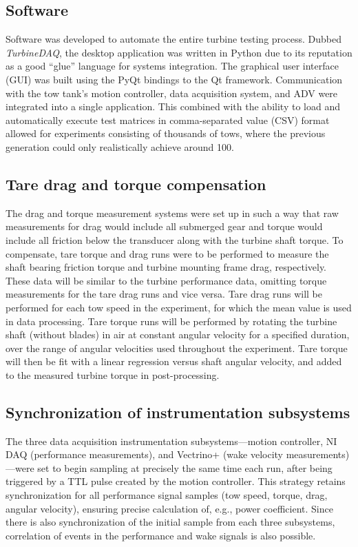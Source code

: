\subsection{Software}

Software was developed to automate the entire turbine testing process. Dubbed
\textit{TurbineDAQ}, the desktop application was written in Python due to its
reputation as a good ``glue'' language for systems integration. The graphical
user interface (GUI) was built using the PyQt bindings to the Qt framework.
Communication with the tow tank's motion controller, data acquisition system,
and ADV were integrated into a single application. This combined with the
ability to load and automatically execute test matrices in comma-separated value
(CSV) format allowed for experiments consisting of thousands of tows, where the
previous generation could only realistically achieve around 100.


\subsection{Tare drag and torque compensation} 

The drag and torque measurement systems were set up in such a way that raw
measurements for drag would include all submerged gear and torque would include
all friction below the transducer along with the turbine shaft torque. To
compensate, tare torque and drag runs were to be performed to measure the shaft
bearing friction torque and turbine mounting frame drag, respectively. These
data will be similar to the turbine performance data, omitting torque
measurements for the tare drag runs and vice versa. Tare drag runs will be
performed for each tow speed in the experiment, for which the mean value is used
in data processing. Tare torque runs will be performed by rotating the turbine
shaft (without blades) in air at constant angular velocity for a specified
duration, over the range of angular velocities used throughout the experiment.
Tare torque will then be fit with a linear regression versus shaft angular
velocity, and added to the measured turbine torque in post-processing.


\subsection{Synchronization of instrumentation subsystems}

The three data acquisition instrumentation subsystems---motion controller, NI
DAQ (performance measurements), and Vectrino+ (wake velocity
measurements)---were set to begin sampling at precisely the same time each run,
after being triggered by a TTL pulse created by the motion controller. This
strategy retains synchronization for all performance signal samples (tow speed,
torque, drag, angular velocity), ensuring precise calculation of, e.g., power
coefficient. Since there is also synchronization of the initial sample from each
three subsystems, correlation of events in the performance and wake signals is
also possible.


